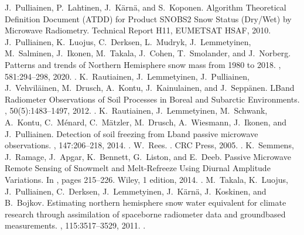 \documentclass[letterpaper,10pt,english]{jupyterBook}
\begin{document}
\begin{sphinxthebibliography}{10}
\sphinxAtStartPar
J. Pulliainen, P. Lahtinen, J. Kärnä, and S. Koponen. Algorithm Theoretical Definition Document (ATDD) for Product SN\sphinxhyphen{}OBS\sphinxhyphen{}2 \sphinxhyphen{} Snow Status (Dry/Wet) by Microwave Radiometry. Technical Report H11, EUMETSAT H\sphinxhyphen{}SAF, 2010.
\sphinxAtStartPar
J. Pulliainen, K. Luojus, C. Derksen, L. Mudryk, J. Lemmetyinen, M. Salminen, J. Ikonen, M. Takala, J. Cohen, T. Smolander, and J. Norberg. Patterns and trends of Northern Hemisphere snow mass from 1980 to 2018. , 581:294–298, 2020. .
\sphinxAtStartPar
K. Rautiainen, J. Lemmetyinen, J. Pulliainen, J. Vehviläinen, M. Drusch, A. Kontu, J. Kainulainen, and J. Seppänen. L\sphinxhyphen{}Band Radiometer Observations of Soil Processes in Boreal and Subarctic Environments. , 50(5):1483–1497, 2012. .
\sphinxAtStartPar
K. Rautiainen, J. Lemmetyinen, M. Schwank, A. Kontu, C. Ménard, C. Mätzler, M. Drusch, A. Wiesmann, J. Ikonen, and J. Pulliainen. Detection of soil freezing from L\sphinxhyphen{}band passive microwave observations. , 147:206–218, 2014. .
\sphinxAtStartPar
W. Rees. . CRC Press, 2005. .
\sphinxAtStartPar
K. Semmens, J. Ramage, J. Apgar, K. Bennett, G. Liston, and E. Deeb. Passive Microwave Remote Sensing of Snowmelt and Melt‐Refreeze Using Diurnal Amplitude Variations. In , pages 215–226. Wiley, 1 edition, 2014. .
\sphinxAtStartPar
M. Takala, K. Luojus, J. Pulliainen, C. Derksen, J. Lemmetyinen, J. Kärnä, J. Koskinen, and B. Bojkov. Estimating northern hemisphere snow water equivalent for climate research through assimilation of space\sphinxhyphen{}borne radiometer data and ground\sphinxhyphen{}based measurements. , 115:3517–3529, 2011. .

\end{sphinxthebibliography}
\end{document}
